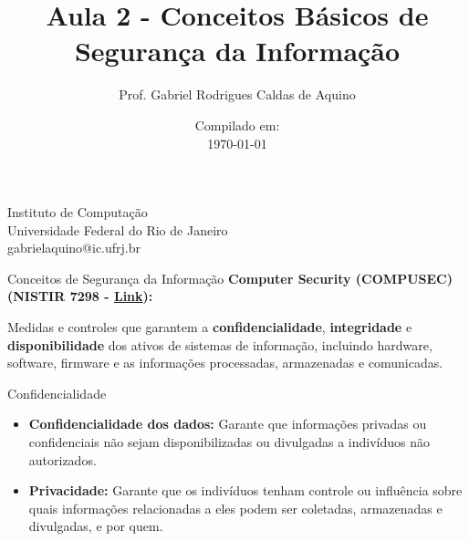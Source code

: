 \title{Aula 2 - Conceitos Básicos de Segurança da Informação}

\author{Prof. Gabriel Rodrigues Caldas de Aquino}

\institute
{
    Instituto de Computação \\
    Universidade Federal do Rio de Janeiro \\
    gabrielaquino@ic.ufrj.br%
}
\date{Compilado em: \\ \today} %



\begin{frame}
    \titlepage
\end{frame}



\begin{frame}{Conceitos de Segurança da Informação}
  \textbf{Computer Security (COMPUSEC) (NISTIR 7298 - \href{https://csrc.nist.gov/pubs/ir/7298/r3/final}{Link}):}
  \begin{block}{}
    Medidas e controles que garantem a \textbf{confidencialidade}, \textbf{integridade} e \textbf{disponibilidade} dos ativos de sistemas de informação, incluindo hardware, software, firmware e as informações processadas, armazenadas e comunicadas.
  \end{block}

  \vspace{0.5cm}

  
\end{frame}
\begin{frame}{Confidencialidade}



    \begin{itemize}
      \item \textbf{Confidencialidade dos dados:} Garante que informações privadas ou confidenciais não sejam disponibilizadas ou divulgadas a indivíduos não autorizados.
      \item \textbf{Privacidade:} Garante que os indivíduos tenham controle ou influência sobre quais informações relacionadas a eles podem ser coletadas, armazenadas e divulgadas, e por quem.
    \end{itemize}

\end{frame}

